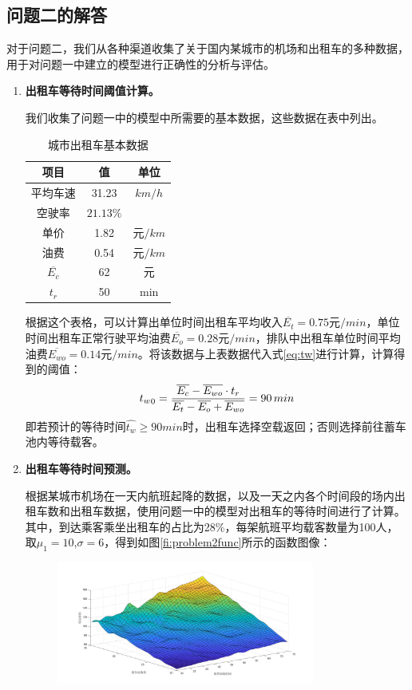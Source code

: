 \documentclass{cumcm}
\begin{document}
\subsection{问题二的解答}
对于问题二，我们从各种渠道收集了关于国内某城市的机场和出租车的多种数据，用于对问题一中建立的模型进行正确性的分析与评估。\par
\begin{enumerate}[(1)]
	\item \textbf{出租车等待时间阈值计算。}\par
	我们收集了问题一中的模型中所需要的基本数据，这些数据在表中列出。
	\begin{table}[H]
		\centering
		\caption{城市出租车基本数据\cite{taxidata,taxireport}} 
		\label{table-symbol}
		\begin{tabular*}{0.31\textwidth}{ccc}
			\toprule
			项目 & 值 & 单位 \\
			\midrule
			平均车速 & 31.23 & $km/h$ \\
			空驶率 & $21.13\%$ & \\
			单价 & 1.82 & 元$/km$ \\
			油费 & 0.54 & 元$/km$ \\
			$\overline{E_c}$ & 62 & 元 \\
			$t_r$ & 50 & min \\
			\bottomrule
		\end{tabular*}
	\end{table}
	根据这个表格，可以计算出单位时间出租车平均收入$\overline{E_t}=0.75\mbox{元}/min$，单位时间出租车正常行驶平均油费$\overline{E_o}=0.28\mbox{元}/min$，排队中出租车单位时间平均油费$\overline{E_{wo}}=0.14\mbox{元}/min$。将该数据与上表数据代入式\ref{eq:tw}进行计算，计算得到的阈值：
	\begin{equation}
		\mbox{$t_w$}_0=\frac{\overline{E_c}-\overline{E_{wo}}\cdot t_r}{\overline{E_t}-\overline{E_o}+\overline{E_{wo}}}=90\,min
	\end{equation}
	即若预计的等待时间$\hat{t_w}\ge90min$时，出租车选择空载返回；否则选择前往蓄车池内等待载客。
	\item \textbf{出租车等待时间预测。}\par
	根据某城市机场在一天内航班起降的数据，以及一天之内各个时间段的场内出租车数和出租车数据，使用问题一中的模型对出租车的等待时间进行了计算。其中，到达乘客乘坐出租车的占比为28\%，每架航班平均载客数量为100人\cite{taxidata,flightdata}，取$\mu_1=10$,$\sigma=6$，得到如图\ref{fi:problem2func}所示的函数图像：
	\begin{figure}[H]
		\centering
		\includegraphics[width=0.8\textwidth]{img/problem2_func.jpg}

\end{figure}
\end{enumerate}
\end{document}

